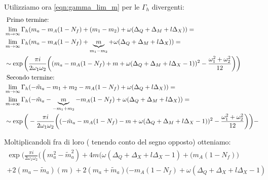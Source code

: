 \documentclass[a4paper,12pt]{article}
\begin{document}
Utilizziamo ora \ref{eqn:gamma_lim_m} per le $\Gamma_h$ divergenti:
\begin{align*}
& \hbox{ Primo termine: }\\
& \lim_{m \rightarrow \infty} \Gamma_h (m_a - m_A (1-N_f) + (m_1 - m_2) + \omega ( \Delta_Q + \Delta_M+ l \Delta_X)) =\\
& \lim_{m \rightarrow \infty}  \Gamma_h (m_a - m_A (1-N_f) + \underbrace{m}_{m_1 - m_2} + \omega ( \Delta_Q + \Delta_M+ l \Delta_X)) = \\ 
&  \sim  \exp \bigg( \frac{\pi i }{2 \omega_1 \omega_2 } \bigg( (m_a - m_A (1-N_f) +m  + \omega ( \Delta_Q + \Delta_M+ l \Delta_X -1 ))^2 - \frac{\omega_1^2 + \omega_2^2}{12}\bigg) \bigg)\\
 & \hbox{ Secondo termine: }\\
& \lim_{m \rightarrow \infty} \Gamma_h ( - \tilde{m}_a - m_1 + m_2 - m_A ( 1 - N_f) + \omega ( \Delta_Q + l \Delta_X)) =\\
& \lim_{m \rightarrow \infty}  \Gamma_h ( - \tilde{m}_a  - \underbrace{m}_{-m_1 + m_2}- m_A (1-N_f) + \omega ( \Delta_Q + \Delta_M+ l \Delta_X	)) = \\ 
&  \sim  \exp \bigg( - \frac{\pi i }{2 \omega_1 \omega_2 } \bigg( (- \tilde{m}_a - m_A (1-N_f) - m  + \omega ( \Delta_Q + \Delta_M+ l \Delta_X -1 ))^2 - \frac{\omega_1^2 + \omega_2^2}{12}\bigg) \bigg)
-\end{align*}
\begin{comment}

\end{comment}
Moltiplicandoli fra di loro ( tenendo conto del segno opposto) otteniamo:
\begin{align*}
\exp \bigg( \frac{\pi i }{2 \omega_1 \omega_2 } \bigg( ( m_a^2 - \tilde{m}_a^2 ) + 4 m \big( \omega( \Delta_Q + \Delta_X + l \Delta_X -1  )+ ( m_A(1-N_f) \big)\\ + 2 ( m_a - \tilde{m}_a) (m) + 2 ( m_a + \tilde{m}_a) ( - m_A ( 1 - N_f) + \omega( \Delta_Q + \Delta_X + l \Delta_X -1 )
\end{align*}
\newpage

%

\end{document}
